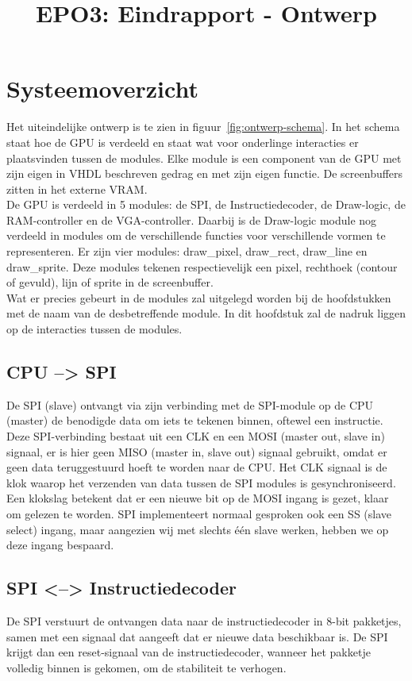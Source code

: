 \documentclass{scrartcl} %
\author{}
\title{EPO3: Eindrapport - Ontwerp}
\begin{document}
\chapter{Systeemoverzicht}
\label{ch:ontwerp}

Het uiteindelijke ontwerp is te zien in figuur~\ref{fig:ontwerp-schema}. In het schema staat hoe de GPU is verdeeld en staat wat voor onderlinge interacties er plaatsvinden tussen de modules.
Elke module is een component van de GPU met zijn eigen in VHDL beschreven gedrag en met zijn eigen functie. De screenbuffers zitten in het externe VRAM. 
\\
De GPU is verdeeld in 5 modules: de SPI, de Instructiedecoder, de Draw-logic, de RAM-controller en de VGA-controller. Daarbij is de Draw-logic module nog verdeeld in modules om de verschillende functies voor verschillende vormen te representeren. Er zijn vier modules: draw\_pixel, draw\_rect, draw\_line en draw\_sprite. Deze modules tekenen respectievelijk een pixel, rechthoek (contour of gevuld), lijn of sprite in de screenbuffer.
\\
Wat er precies gebeurt in de modules zal uitgelegd worden bij de hoofdstukken met de naam van de desbetreffende module. In dit hoofdstuk zal de nadruk liggen op de interacties tussen de modules.

\section{CPU --> SPI}
De SPI (slave) ontvangt via zijn verbinding met de SPI-module op de CPU (master) de benodigde data om iets te tekenen binnen, oftewel een instructie. Deze SPI-verbinding bestaat uit een CLK en een MOSI (master out, slave in) signaal, er is hier geen MISO (master in, slave out) signaal gebruikt, omdat er geen data teruggestuurd hoeft te worden naar de CPU. Het CLK signaal is de klok waarop het verzenden van data tussen de SPI modules is gesynchroniseerd. Een klokslag betekent dat er een nieuwe bit op de MOSI ingang is gezet, klaar om gelezen te worden. 
SPI implementeert normaal gesproken ook een SS (slave select) ingang, maar aangezien wij met slechts één slave werken, hebben we op deze ingang bespaard.

\section{SPI <--> Instructiedecoder}
De SPI verstuurt de ontvangen data naar de instructiedecoder in 8-bit pakketjes, samen met een signaal dat aangeeft dat er nieuwe data beschikbaar is. De SPI krijgt dan een reset-signaal van de instructiedecoder, wanneer het pakketje volledig binnen is gekomen, om de stabiliteit te verhogen.
\end{document}
